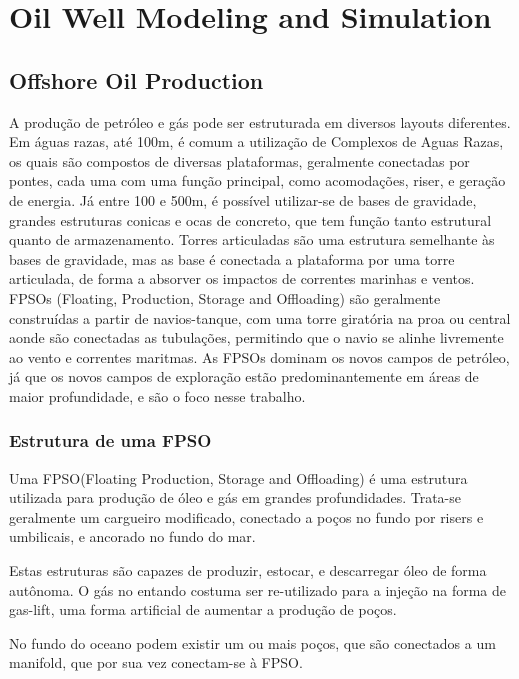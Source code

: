 

\chapter{Oil Well Modeling and Simulation} \label{chap:2}


\section{Offshore Oil Production}

A produção de petróleo e gás pode ser estruturada em diversos layouts diferentes. Em águas razas, até 100m, é comum a utilização de Complexos de Aguas Razas, os quais são compostos de diversas plataformas, geralmente conectadas por pontes, cada uma com uma função principal, como acomodações, riser, e geração de energia.
Já entre 100 e 500m, é possível utilizar-se de bases de gravidade, grandes estruturas conicas e ocas de concreto, que tem função tanto estrutural quanto de armazenamento. Torres articuladas são uma estrutura semelhante às bases de gravidade, mas as base é conectada a plataforma por uma torre articulada, de forma a absorver os impactos de correntes marinhas e ventos.
FPSOs (Floating, Production, Storage and Offloading) são geralmente construídas a partir de navios-tanque, com uma torre giratória na proa ou central aonde são conectadas as tubulações, permitindo que o navio se alinhe livremente ao vento e correntes maritmas. As FPSOs dominam os novos campos de petróleo, já que os novos campos de exploração estão predominantemente em áreas de maior profundidade, e são o foco nesse trabalho.

\subsection{Estrutura de uma FPSO}
Uma FPSO(Floating Production, Storage and Offloading) é uma estrutura utilizada para produção de óleo e gás em grandes profundidades. Trata-se geralmente um cargueiro modificado, conectado a poços no fundo por risers e umbilicais, e ancorado no fundo do mar.

Estas estruturas são capazes de produzir, estocar, e descarregar óleo de forma autônoma. O gás no entando costuma ser re-utilizado para a injeção na forma de gas-lift, uma forma artificial de aumentar a produção de poços.

No fundo do oceano podem existir um ou mais poços, que são conectados a um manifold, que por sua vez conectam-se à FPSO.

